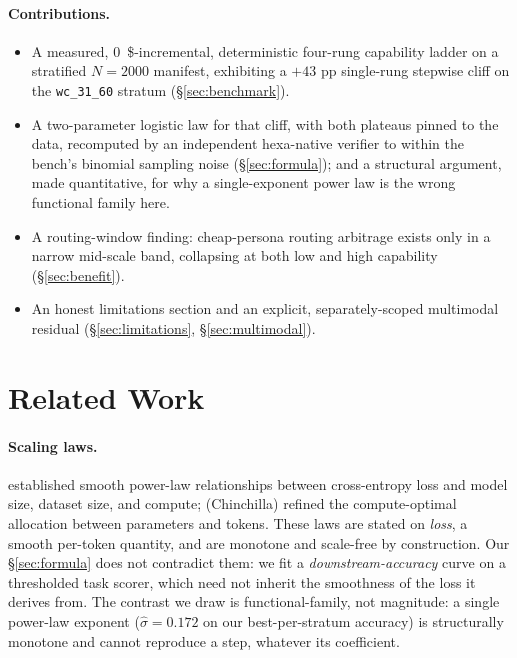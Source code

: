 \documentclass[11pt,a4paper]{article}
\begin{document}
\paragraph{Contributions.}
\begin{itemize}
  \item A measured, \SI{0}{\$}-incremental, deterministic four-rung
    capability ladder on a stratified \(N{=}2000\) manifest, exhibiting a
    \(+43\) pp single-rung stepwise cliff on the \texttt{wc\_31\_60} stratum
    (§\ref{sec:benchmark}).
  \item A two-parameter logistic law for that cliff, with both plateaus
    pinned to the data, recomputed by an independent hexa-native verifier to
    within the bench's binomial sampling noise (§\ref{sec:formula}); and a
    structural argument, made quantitative, for why a single-exponent power
    law is the wrong functional family here.
  \item A routing-window finding: cheap-persona routing arbitrage exists
    only in a narrow mid-scale band, collapsing at both low and high
    capability (§\ref{sec:benefit}).
  \item An honest limitations section and an explicit, separately-scoped
    multimodal residual (§\ref{sec:limitations}, §\ref{sec:multimodal}).
\end{itemize}

\section{Related Work}
\label{sec:related}
\paragraph{Scaling laws.} \citet{kaplan2020scaling} established smooth
power-law relationships between cross-entropy loss and model size, dataset
size, and compute; \citet{hoffmann2022chinchilla} (Chinchilla) refined the
compute-optimal allocation between parameters and tokens. These laws are
stated on \emph{loss}, a smooth per-token quantity, and are monotone and
scale-free by construction. Our §\ref{sec:formula} does not contradict them:
we fit a \emph{downstream-accuracy} curve on a thresholded task scorer,
which need not inherit the smoothness of the loss it derives from. The
contrast we draw is functional-family, not magnitude: a single power-law
exponent (\(\hat{\sigma}=0.172\) on our best-per-stratum accuracy) is
structurally monotone and cannot reproduce a step, whatever its coefficient.
\end{document}
